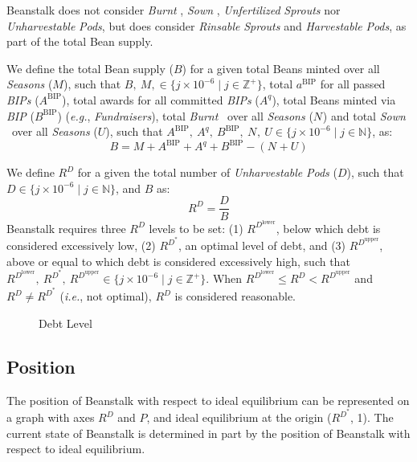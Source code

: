 \documentclass[tikz]{article}
\newcommand{\term}[1]{\textsl{#1}}
\newcommand{\Bean}{} %
\newcommand{\bean}{} %
\begin{document}
Beanstalk does not consider \term{Burnt} \Bean, \term{Sown} \Bean, \term{Unfertilized} \term{Sprouts} nor \term{Unharvestable} \term{Pods}, but does consider \term{Rinsable} \term{Sprouts} and \term{Harvestable} \term{Pods}, as part of the total Bean supply.

We define the total Bean supply ($B$) for a given total Beans minted over all \term{Seasons} ($M$), such that $B,\ M, \in \{j \times 10^{-6} \mid j \in \mathbb{Z}^{+} \}$, total $a^{\text{BIP}}$ for all passed \term{BIPs} ($A^{\text{BIP}}$), total awards for all committed \term{BIPs} ($A^q$), total Beans minted via \term{BIP} ($B^{\text{BIP}}$) (\term{e.g.}, \term{Fundraisers}), total \term{Burnt} \Bean\ over all \term{Seasons} ($N^{\bean}$) and total \term{Sown} \Bean\ over all \term{Seasons} ($U$), such that $A^{\text{BIP}},\ A^q,\ B^{\text{BIP}},\ N^{\bean},\ U \in \{j \times 10^{-6} \mid j \in \mathbb{N} \}$, as:
$$B = M + A^{\text{BIP}} + A^q + B^{\text{BIP}} - (N^{\bean} + U)$$

We define $R^D$ for a given the total number of \term{Unharvestable} \term{Pods} ($D$), such that $D \in \{j \times 10^{-6} \mid j \in \mathbb{N} \}$, and $B$ as:
$$R^D = \frac{D}{B}$$
Beanstalk requires three $R^D$ levels to be set: (1) $R^{D^{\text{lower}}}$, below which debt is considered excessively low, (2) $R^{D^*}$, an optimal level of debt, and (3) $R^{D^{\text{upper}}}$, above or equal to which debt is considered excessively high, such that $R^{D^{\text{lower}}},\ R^{D^*},\ R^{D^{\text{upper}}} \in \{j \times 10^{-6} \mid j \in \mathbb{Z}^{+} \}$. When $R^{D^{\text{lower}}} \leq R^D < R^{D^{\text{upper}}}$ and $R^D \neq R^{D^*}$ (\term{i.e.}, not optimal), $R^D$ is considered reasonable.

\begin{figure}[h!]
    \centering
    
    \vspace*{-7mm}
    \setlength{\belowcaptionskip}{-8pt} %
    \caption{Debt Level}
    \label{Fig 4}
\end{figure}

\subsection{Position}
The position of Beanstalk with respect to ideal equilibrium can be represented on a graph with axes $R^D$ and $P$, and ideal equilibrium at the origin ($R^{D^*}$, 1). The current state of Beanstalk is determined in part by the position of Beanstalk with respect to ideal equilibrium. 
\end{document}
